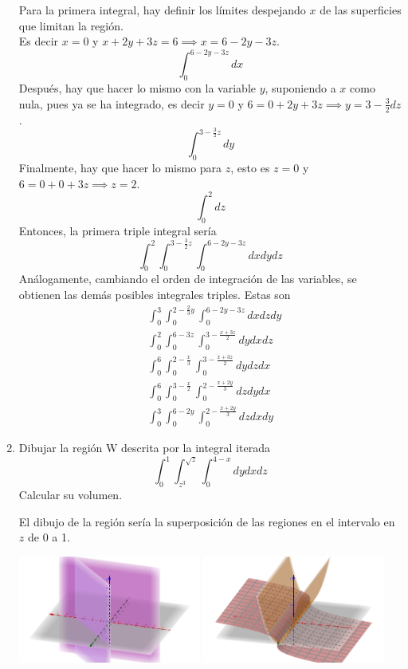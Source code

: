 \documentclass{article}
\begin{document}
\begin{enumerate}
{				Para la primera integral, hay definir los límites despejando $x$ de las
				superficies que limitan la región.\\
				Es decir $x = 0$ y $x + 2y + 3z = 6 \implies x = 6 - 2y - 3z$.
				\[\int_{0}^{6-2y-3z} dx\]
				Después, hay que hacer lo mismo con la variable $y$, suponiendo a $x$
				como nula, pues ya se ha integrado, es decir $y = 0$ y
				$6 = 0 + 2y + 3z \implies y = 3- \frac{3}{2}dz$.
				\[\int_{0}^{3-\frac{3}{2}z} dy\]
				Finalmente, hay que hacer lo mismo para $z$, esto es $z = 0$ y
				$6 = 0 + 0 + 3z \implies z = 2$.
				\[\int_{0}^{2} dz\]
				Entonces, la primera triple integral sería
				\[\int_{0}^{2} \int_{0}^{3-\frac{3}{2}z} \int_{0}^{6-2y-3z} dxdydz\]
				Análogamente, cambiando el orden de integración de las variables, se
				obtienen las demás posibles integrales triples.
				Estas son
        \begin{align*}
            &\int_{0}^{3} \int_{0}^{2-\frac{2}{3}y} \int_{0}^{6-2y-3z} dxdzdy\\
            &\int_{0}^{2} \int_{0}^{6-3z} \int_{0}^{3-\frac{x+3z}{2}} dydxdz\\
            &\int_{0}^{6} \int_{0}^{2-\frac{x}{3}} \int_{0}^{3-\frac{x+3z}{2}} dydzdx\\
            &\int_{0}^{6} \int_{0}^{3-\frac{x}{2}} \int_{0}^{2-\frac{x+2y}{3}} dzdydx\\
            &\int_{0}^{3} \int_{0}^{6-2y} \int_{0}^{2-\frac{x+2y}{3}} dzdxdy
        \end{align*}

	}

    \item {
        Dibujar la región W descrita por la integral iterada
        \[
            \int_{0}^{1} \int_{z^3}^{\sqrt{z}} \int_{0}^{4-x} dydxdz
        \]
        Calcular su volumen.

        \color{azul}

				El dibujo de la región sería la superposición de las regiones en el
				intervalo en $z$ de 0 a 1.
				\begin{center}
            \includegraphics[width=6cm]{img/ej2_1.png}
						\includegraphics[width=6cm]{img/ej2_2.png}
        \end{center}

}
\end{enumerate}
\end{document}
